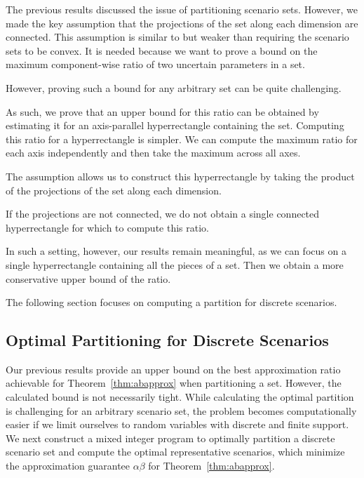 \documentclass{article}
\begin{document}
The previous results discussed the issue of partitioning scenario sets. 
However, we made the key assumption that the projections of the set along each dimension are connected.
This assumption is similar to but weaker than requiring the scenario sets to be convex. 
It is needed because we want to prove a bound on the maximum component-wise ratio of two uncertain parameters in a set.  

However, proving such a bound for any arbitrary set can be quite challenging. 

As such, we prove that an upper bound for this ratio can be obtained by estimating it for an axis-parallel hyperrectangle containing the set.
Computing this ratio for a hyperrectangle is simpler. 
We can compute the maximum ratio for each axis independently and then take the maximum across all axes. 

The assumption allows us to construct this hyperrectangle by taking the product of the projections of the set along each dimension. 

If the projections are not connected, we do not obtain a single connected hyperrectangle for which to compute this ratio. 

In such a setting, however, our results remain meaningful, as we can focus on a single hyperrectangle containing all the pieces of a set.
Then we obtain a more conservative upper bound of the ratio.


The following section focuses on computing a partition for discrete scenarios.


\subsection{Optimal Partitioning for Discrete Scenarios}\label{Sec:Discrete_Scenarios}
Our previous results provide an upper bound on the best approximation ratio achievable for Theorem~\ref{thm:abapprox} when partitioning a set.
However, the calculated bound is not necessarily tight.
While calculating the optimal partition is challenging for an
arbitrary scenario set, the problem becomes computationally easier if we limit ourselves to random variables with discrete and finite support.
We next construct a mixed integer program to optimally partition a discrete scenario set and compute the optimal representative scenarios, which minimize the approximation guarantee \(\alpha \beta\) for Theorem~\ref{thm:abapprox}.
\end{document}
